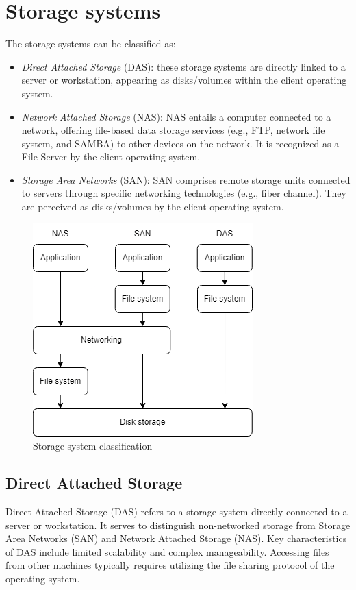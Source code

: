 \section{Storage systems}

The storage systems can be classified as: 
\begin{itemize}
    \item \textit{Direct Attached Storage} (DAS): these storage systems are directly linked to a server or workstation, appearing as disks/volumes within the client operating system.
    \item \textit{Network Attached Storage} (NAS): NAS entails a computer connected to a network, offering file-based data storage services (e.g., FTP, network file system, and SAMBA) to other devices on the network. 
        It is recognized as a File Server by the client operating system.
    \item \textit{Storage Area Networks} (SAN): SAN comprises remote storage units connected to servers through specific networking technologies (e.g., fiber channel). 
        They are perceived as disks/volumes by the client operating system.
\end{itemize}
\begin{figure}[H]
    \centering
    \includegraphics[width=0.4\linewidth]{images/ssc.png}
    \caption{Storage system classification}
\end{figure}

\subsection{Direct Attached Storage}
Direct Attached Storage (DAS) refers to a storage system directly connected to a server or workstation. 
It serves to distinguish non-networked storage from Storage Area Networks (SAN) and Network Attached Storage (NAS). 
Key characteristics of DAS include limited scalability and complex manageability. 
Accessing files from other machines typically requires utilizing the file sharing protocol of the operating system.

